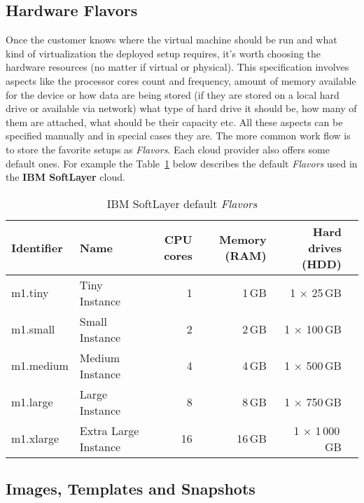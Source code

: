 \subsection{Hardware Flavors}
\label{sub:Hardware Flavors}

Once the customer knows where the virtual machine should be run and what kind of virtualization the deployed setup requires, it's worth choosing the hardware resources (no matter if virtual or physical). This specification involves aspects like the processor cores count and frequency, amount of memory available for the device or how data are being stored (if they are stored on a local hard drive or available via network) what type of hard drive it should be, how many of them are attached, what should be their capacity etc. All these aspects can be specified manually and in special cases they are. The more common work flow is to store the favorite setups as \emph{Flavors}. Each cloud provider also offers some default ones. For example the Table~\ref{tab:IBM SoftLayer default Flavors} below describes the default \emph{Flavors} used in the \textbf{IBM SoftLayer} cloud.

\begin{table}[ht]
	\centering
	\caption{IBM SoftLayer default \emph{Flavors}}\label{tab:IBM SoftLayer default Flavors}
	\begin{tabular}{llrrrr}
		\toprule
		Identifier & Name                 & CPU cores & Memory (RAM) & Hard drives (HDD)     \\
		\midrule
		m1.tiny    & Tiny Instance        & 1         & 1\,GB        & 1 $\times$ 25\,GB     \\
		m1.small   & Small Instance       & 2         & 2\,GB        & 1 $\times$ 100\,GB    \\
		m1.medium  & Medium Instance      & 4         & 4\,GB        & 1 $\times$ 500\,GB    \\
		m1.large   & Large Instance       & 8         & 8\,GB        & 1 $\times$ 750\,GB    \\
		m1.xlarge  & Extra Large Instance & 16        & 16\,GB       & 1 $\times$ 1\,000\,GB \\
		\bottomrule
	\end{tabular}
\end{table}

\subsection{Images, Templates and Snapshots}
\label{sub:Images, Templates and Snapshots}

